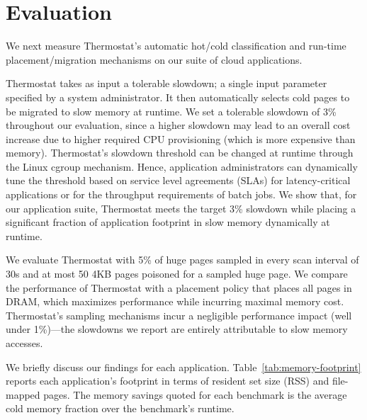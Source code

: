 \section{Evaluation}
\label{results}

We next measure Thermostat's automatic hot/cold classification and run-time
placement/migration mechanisms on our suite of cloud applications.

Thermostat takes as input a tolerable slowdown; a single input parameter 
specified by a system administrator.  It then automatically selects cold pages
 to be migrated to slow memory at runtime. We set a tolerable slowdown of
3\% throughout our evaluation, since a higher slowdown may lead to an overall
cost increase due to higher required CPU provisioning (which is more expensive
than memory). Thermostat's slowdown threshold can be 
changed at runtime through the Linux cgroup mechanism. Hence,
application administrators can
dynamically tune the threshold based on service level agreements
(SLAs) for latency-critical applications or for the throughput requirements of
batch jobs.  We show that, for our application suite, Thermostat meets the
target 3\% slowdown while placing a significant fraction of application footprint in slow memory
dynamically at runtime.


We evaluate Thermostat with 5\% of huge pages sampled in every scan interval of
30s and at most 50 4KB pages poisoned for a sampled huge page.
We compare the performance of Thermostat with a placement policy that
places all pages in DRAM, which maximizes performance while incurring maximal 
memory cost.  Thermostat's sampling mechanisms incur a negligible performance
impact (well under 1\%)---the slowdowns we report are entirely attributable to 
slow memory accesses. 

We briefly discuss our findings for each application. Table~\ref{tab:memory-footprint} reports each 
application's footprint in terms of resident set size (RSS) and file-mapped
pages. The memory savings quoted for each benchmark is the average cold memory
fraction over the benchmark's runtime.


